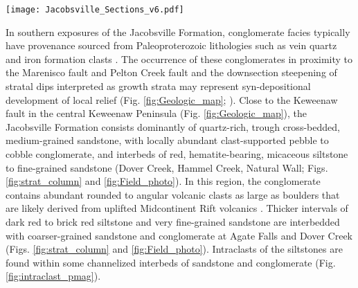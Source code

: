 \begin{figure*}[h!]
\centering
\texttt{[image: Jacobsville\_Sections\_v6.pdf]}
\caption{Lithostratigraphy and magnetostratigraphy for studied sections of the Jacobsville Formation in northern Michigan, USA. GPS locations for the base and top of the sections are noted. Paleomagnetic sampling focused on the dark red siltstone to fine-grained sandstone lithofacies. Paleomagnetic specimen declinations are plotted with blue circles corresponding to normal polarity and orange circles to reverse polarity. The maximum depositional age of the Agate Falls section is constrained by a CA-ID-TIMS detrital zircon U-Pb date of 1003.2 $\pm$ 2.2 Ma (sample AF1-29.3 of ). In the Snake Creek tributary and Natural Wall sections, the position of the detrital zircon samples BSC1-92.5 and NW1–61.5 from  are shown. No U-Pb zircon dates from these samples were younger than the age of Midcontinent Rift volcanics. A correlation of a facies association consisting of volcanic-clast conglomerate, coarse arkosic sandstone, and dark red clay-rich siltstone is inferred between the sections at Dover Creek (along Dover Creek and a tributary falls), Hammel Creek, and Natural Wall \cite{Brojanigo1984a}. The stratigraphic correlation between Jacobsville sections at Agate Falls and Snake Creek tributary with these correlated sections from the central Keweenaw Peninsula is relatively uncertain.}
\label{fig:strat_column}
\end{figure*}

In southern exposures of the Jacobsville Formation, conglomerate facies typically have provenance sourced from Paleoproterozoic lithologies such as vein quartz and iron formation clasts \cite{Hamblin1958a, Kalliokoski1982a}. The occurrence of these conglomerates in proximity to the Marenisco fault and Pelton Creek fault and the downsection steepening of stratal dips interpreted as growth strata may represent syn-depositional development of local relief (Fig. \ref{fig:Geologic_map}; ). Close to the Keweenaw fault in the central Keweenaw Peninsula (Fig. \ref{fig:Geologic_map}), the Jacobsville Formation consists dominantly of quartz-rich, trough cross-bedded, medium-grained sandstone, with locally abundant clast-supported pebble to cobble conglomerate, and interbeds of red, hematite-bearing, micaceous siltstone to fine-grained sandstone (Dover Creek, Hammel Creek, Natural Wall; Figs. \ref{fig:strat_column} and \ref{fig:Field_photo}). In this region, the conglomerate contains abundant rounded to angular volcanic clasts as large as boulders that are likely derived from uplifted Midcontinent Rift volcanics \cite{Irving1885a, Brojanigo1984a}. Thicker intervals of dark red to brick red siltstone and very fine-grained sandstone are interbedded with coarser-grained sandstone and conglomerate at Agate Falls and Dover Creek (Figs. \ref{fig:strat_column} and \ref{fig:Field_photo}). Intraclasts of the siltstones are found within some channelized interbeds of sandstone and conglomerate (Fig. \ref{fig:intraclast_pmag}). 

